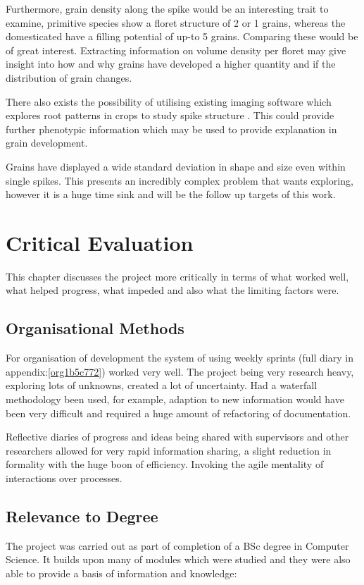 \documentclass[11pt]{report}
\begin{document}
Furthermore, grain density along the spike would be an interesting trait to examine, primitive species show a floret structure of 2 or 1 grains, whereas the domesticated have a filling potential of up-to 5 grains. Comparing these would be of great interest. Extracting information on volume density per floret may give insight into how and why grains have developed a higher quantity and if the distribution of grain changes.

There also exists the possibility of utilising existing imaging software which explores root patterns in crops to study spike structure \cite{Mairhofer2015,Daly2017}. This could provide further phenotypic information which may be used to provide explanation in grain development.

Grains have displayed a wide standard deviation in shape and size even within single spikes. This presents an incredibly complex problem that wants exploring, however it is a huge time sink and will be the follow up targets of this work.

\chapter{Critical Evaluation}
\label{sec:org13be180}
This chapter discusses the project more critically in terms of what worked well, what helped progress, what impeded and also what the limiting factors were.

\section{Organisational Methods}
\label{sec:org7b0d2bf}
For organisation of development the system of using weekly sprints (full diary in appendix:\ref{org1b5c772}) worked very well. The project being very research heavy, exploring lots of unknowns, created a lot of uncertainty. Had a waterfall methodology been used, for example, adaption to new information would have been very difficult and required a huge amount of refactoring of documentation.

Reflective diaries of progress and ideas being shared with supervisors and other researchers allowed for very rapid information sharing, a slight reduction in formality with the huge boon of efficiency. Invoking the agile mentality of interactions over processes.

\section{Relevance to Degree}
\label{sec:org3ba3fe0}
The project was carried out as part of completion of a BSc degree in Computer Science. It builds upon many of modules which were studied and they were also able to provide a basis of information and knowledge:
\end{document}
